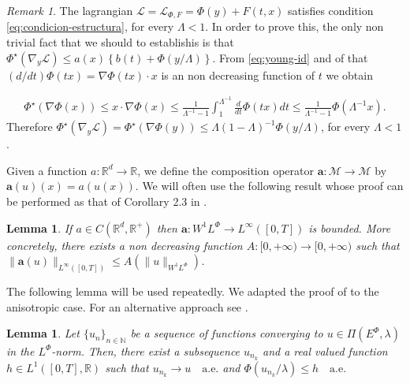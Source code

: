 \documentclass[twoside]{article}
\newtheorem{lem}[thm]{Lemma}
\theoremstyle{remark}
\newtheorem{comentario}{Remark}
\newcommand{\lphi}{L^{\Phi}}
\newcommand{\ephi}{E^{\Phi}}
\newcommand{\wphi}{W^{1}\lphi}
\renewcommand{\b}[1]{\boldsymbol{#1}}
\newcommand{\rr}{\mathbb{R}}
\renewcommand{\leq}{\leqslant}
\begin{document}
\begin{comentario}\label{com:lphi-satis S}
 The lagrangian $\mathcal{L}=\mathcal{L}_{\Phi,F}=\Phi(y)+F(t,x)$ satisfies condition  \eqref{eq:condicion-estructura}, for every $\Lambda<1$. In order to prove this, the only non trivial fact that we should to establishis is that $ \Phi^{\star}(\nabla_{y}\mathcal{L})
\leq
a(x)\left\{b(t)+ \Phi\left({y}/{\Lambda}\right)\right\}$. From  \eqref{eq:young-id} and of that $(d/dt)\Phi(tx)=\nabla\Phi(tx)\cdot x$ is an non decreasing function of $t$ we obtain  

\[
  \begin{split}
     \Phi^{\star}(\nabla \Phi (x))\leq  x\cdot \nabla\Phi(x) \leq\frac{1}{\Lambda^{-1}-1}\int_1^{\Lambda^{-1}} \frac{d}{dt}\Phi(tx)dt \leq\frac{1}{\Lambda^{-1}-1}\Phi(\Lambda^{-1} x). \end{split}
\]
Therefore  $\Phi^{\star}(\nabla_{y}\mathcal{L})=\Phi^{\star}\left(\nabla\Phi(y)\right)\leq \Lambda(1-\Lambda)^{-1} \Phi(y/\Lambda )$, for every $\Lambda<1$. 
\end{comentario}

Given a function $a:\mathbb{R}^d\to \mathbb{R}$, we define the composition operator $\b{a}:\mathcal{M}\to \mathcal{M}$ by $\b{a}(u)(x)= a(u(x))$.
We will often use the following result whose proof can be performed as that of  Corollary 2.3 in \cite{ABGMS2015}.


\begin{lem}\label{lem:cota-a}
\label{a_bound} If $a\in C(\mathbb{R}^d,\mathbb{R}^+)$ then $\b{a}:\wphi\to L^{\infty}([0,T])$ is bounded.
More concretely,  there exists a non decreasing function $A:[0,+\infty)\to[0,+\infty)$ such that
 $\|\b{a}(u)\|_{L^{\infty}([0,T])}\leq A(\|u\|_{\wphi})$.
\end{lem}

The following lemma will be used repeatedly. We adapted the proof of 
\cite[Lemma 2.5]{ABGMS2015} to the anisotropic case.    For an alternative approach see \cite{chamra2017anisotropic}.  







\begin{lem}\label{segundo lema}
Let  $\{{u}_n\}_{n\in \mathbb{N}}$ be a sequence of  functions  converging to  ${u}\in \Pi(\ephi,\lambda)$  in the $\lphi$-norm. Then, there exist a subsequence
${u}_{n_k}$ and a real valued function $h\in L^1([0,T],\rr)$ such that ${u}_{n_k}\rightarrow {u} \quad\text{a.e.}$ and $\Phi({u}_{n_k}/\lambda)\leq h\quad\text{a.e.}$
\end{lem}
\end{document}
